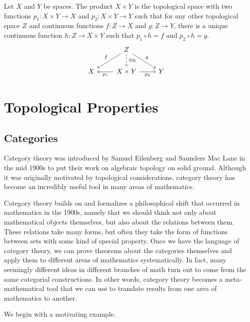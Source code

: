 \documentclass[noname]{notes}
\begin{document}
\begin{theorem}
\label{universal property of the product}
	Let $X$ and $Y$ be spaces. The product $X \times Y$ is the topological space with two functions $p_1 \colon X \times Y \to X$ and $p_2 \colon X \times Y \to Y$ such that for any other topological space $Z$ and continuous functions $f \colon Z \to X$ and $g \colon Z \to Y$, there is a unique continuous function $h \colon Z \to X \times Y$ such that $p_1 \circ h = f$ and $p_2 \circ h = g$. 
	\[
		\begin{tikzcd}
			& Z \ar[d, dashed, "\exists ! h"] \ar[dl, "f"'] \ar[dr, "g"] \\
			X & X \times Y \ar[l, "p_1"] \ar[r, "p_2"'] & Y
		\end{tikzcd}
	\]
\end{theorem}

\chapter{Topological Properties}



\section{Categories}

Category theory was introduced by Samuel Eilenberg and Saunders Mac Lane in the mid 1900s to put their work on algebraic topology on solid ground. Although it was originally motivated by topological considerations, category theory has become an incredibly useful tool in many areas of mathematics. 

Category theory builds on and formalizes a philosophical shift that occurred in mathematics in the 1900s, namely that we should think not only about mathematical objects themselves, but also about the relations between them. These relations take many forms, but often they take the form of functions between sets with some kind of special property. Once we have the language of category theory, we can prove theorems about the categories themselves and apply them to different areas of mathematics systematically. In fact, many seemingly different ideas in different branches of math turn out to come from the same categorial constructions. In other words, category theory becomes a meta-mathematical tool that we can use to translate results from one area of mathematics to another. 

We begin with a motivating example. 
\end{document}
